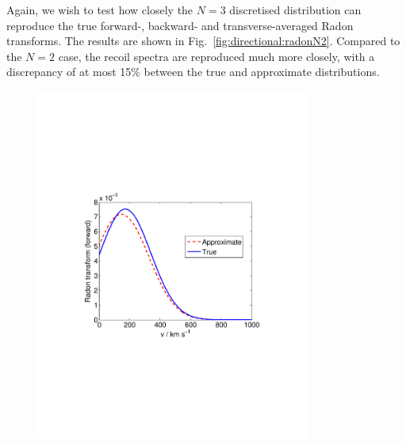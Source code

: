 Again, we wish to test how closely the $N=3$ discretised distribution can reproduce the true forward-, backward- and transverse-averaged Radon transforms. The results are shown in Fig.~\ref{fig:directional:radonN2}. Compared to the $N=2$ case, the recoil spectra are reproduced much more closely, with a discrepancy of at most 15\%  between the true and approximate distributions.


\begin{figure}[t]
\label{fig:directional:radonN3}
  \centering
  \includegraphics[trim={2cm 8cm 2cm 8cm},clip,width=0.80\textwidth]{Directional/N3-forward.pdf}


\end{figure}
